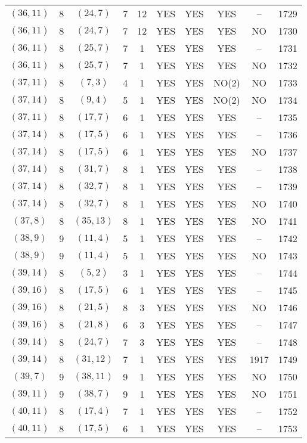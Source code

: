 \begin{longtable}{|c|c|c|c|c|c|c|c|c|c|}
$(36, 11)$ & 8 & $(24, 7)$ & 7 & 12 & YES & YES & YES & -- & 1729\\
$(36, 11)$ & 8 & $(24, 7)$ & 7 & 12 & YES & YES & YES & NO & 1730\\
$(36, 11)$ & 8 & $(25, 7)$ & 7 & 1 & YES & YES & YES & -- & 1731\\
$(36, 11)$ & 8 & $(25, 7)$ & 7 & 1 & YES & YES & YES & NO & 1732\\
$(37, 11)$ & 8 & $(7, 3)$ & 4 & 1 & YES & YES & NO(2) & NO & 1733\\
$(37, 14)$ & 8 & $(9, 4)$ & 5 & 1 & YES & YES & NO(2) & NO & 1734\\
$(37, 11)$ & 8 & $(17, 7)$ & 6 & 1 & YES & YES & YES & -- & 1735\\
$(37, 14)$ & 8 & $(17, 5)$ & 6 & 1 & YES & YES & YES & -- & 1736\\
$(37, 14)$ & 8 & $(17, 5)$ & 6 & 1 & YES & YES & YES & NO & 1737\\
$(37, 14)$ & 8 & $(31, 7)$ & 8 & 1 & YES & YES & YES & -- & 1738\\
$(37, 14)$ & 8 & $(32, 7)$ & 8 & 1 & YES & YES & YES & -- & 1739\\
$(37, 14)$ & 8 & $(32, 7)$ & 8 & 1 & YES & YES & YES & NO & 1740\\
$(37, 8)$ & 8 & $(35, 13)$ & 8 & 1 & YES & YES & YES & NO & 1741\\
$(38, 9)$ & 9 & $(11, 4)$ & 5 & 1 & YES & YES & YES & -- & 1742\\
$(38, 9)$ & 9 & $(11, 4)$ & 5 & 1 & YES & YES & YES & NO & 1743\\
$(39, 14)$ & 8 & $(5, 2)$ & 3 & 1 & YES & YES & YES & -- & 1744\\
$(39, 16)$ & 8 & $(17, 5)$ & 6 & 1 & YES & YES & YES & -- & 1745\\
$(39, 16)$ & 8 & $(21, 5)$ & 8 & 3 & YES & YES & YES & NO & 1746\\
$(39, 16)$ & 8 & $(21, 8)$ & 6 & 3 & YES & YES & YES & -- & 1747\\
$(39, 14)$ & 8 & $(24, 7)$ & 7 & 3 & YES & YES & YES & -- & 1748\\
$(39, 14)$ & 8 & $(31, 12)$ & 7 & 1 & YES & YES & YES & 1917 & 1749\\
$(39, 7)$ & 9 & $(38, 11)$ & 9 & 1 & YES & YES & YES & NO & 1750\\
$(39, 11)$ & 9 & $(38, 7)$ & 9 & 1 & YES & YES & YES & NO & 1751\\
$(40, 11)$ & 8 & $(17, 4)$ & 7 & 1 & YES & YES & YES & -- & 1752\\
$(40, 11)$ & 8 & $(17, 5)$ & 6 & 1 & YES & YES & YES & -- & 1753\\

\end{longtable}

